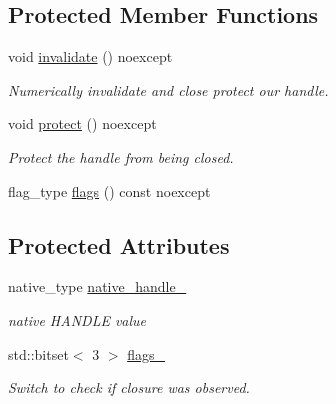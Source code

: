 \subsection*{Protected Member Functions}
\begin{DoxyCompactItemize}
\item 
\mbox{\label{classdistant_1_1detail_1_1handle__base_a6c93e0715a2cd1d29f65290b37d31504}} 
void \mbox{\hyperlink{classdistant_1_1detail_1_1handle__base_a6c93e0715a2cd1d29f65290b37d31504}{invalidate}} () noexcept
\begin{DoxyCompactList}\small\item\em Numerically invalidate and close protect our handle. \end{DoxyCompactList}\item 
\mbox{\label{classdistant_1_1detail_1_1handle__base_a8c70a0ccd10860c774b54d8656cbb910}} 
void \mbox{\hyperlink{classdistant_1_1detail_1_1handle__base_a8c70a0ccd10860c774b54d8656cbb910}{protect}} () noexcept
\begin{DoxyCompactList}\small\item\em Protect the handle from being closed. \end{DoxyCompactList}\item 
flag\+\_\+type \mbox{\hyperlink{classdistant_1_1detail_1_1handle__base_adc97dc91543d76d0b89f43fee5f5f26b}{flags}} () const noexcept
\end{DoxyCompactItemize}
\subsection*{Protected Attributes}
\begin{DoxyCompactItemize}
\item 
\mbox{\label{classdistant_1_1detail_1_1handle__base_ad46610dae2b7f1b3e0e2ab6bb8ef6b2e}} 
native\+\_\+type \mbox{\hyperlink{classdistant_1_1detail_1_1handle__base_ad46610dae2b7f1b3e0e2ab6bb8ef6b2e}{native\+\_\+handle\+\_\+}}
\begin{DoxyCompactList}\small\item\em native H\+A\+N\+D\+LE value \end{DoxyCompactList}\item 
\mbox{\label{classdistant_1_1detail_1_1handle__base_af55692a0434e08d17849e92ad86c420d}} 
std\+::bitset$<$ 3 $>$ \mbox{\hyperlink{classdistant_1_1detail_1_1handle__base_af55692a0434e08d17849e92ad86c420d}{flags\+\_\+}}
\begin{DoxyCompactList}\small\item\em Switch to check if closure was observed. \end{DoxyCompactList}\end{DoxyCompactItemize}
